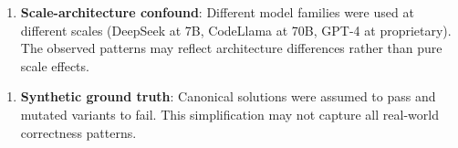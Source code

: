 \begin{enumerate}
\item \textbf{Scale-architecture confound}: Different model families were used at different scales (DeepSeek at 7B, CodeLlama at 70B, GPT-4 at proprietary). The observed patterns may reflect architecture differences rather than pure scale effects.
\end{enumerate}

\begin{enumerate}
\item \textbf{Synthetic ground truth}: Canonical solutions were assumed to pass and mutated variants to fail. This simplification may not capture all real-world correctness patterns.
\end{enumerate}


